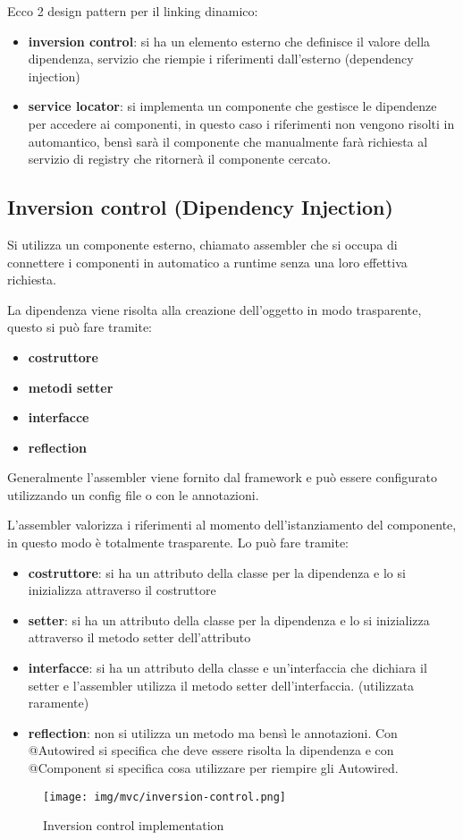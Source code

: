 Ecco 2 design pattern per il linking dinamico:
\begin{itemize}
    \item \textbf{inversion control}: si ha un elemento esterno che definisce il valore 
    della dipendenza, servizio che riempie i riferimenti dall'esterno (dependency injection)
    \item \textbf{service locator}: si implementa un componente che gestisce le dipendenze
    per accedere ai componenti, in questo caso i riferimenti non vengono risolti in
    automantico, bensì sarà il componente che manualmente farà richiesta al servizio
    di registry che ritornerà il componente cercato.
\end{itemize}
\subsection{Inversion control (Dipendency Injection)}
Si utilizza un componente esterno, chiamato assembler che si occupa di connettere
i componenti in automatico a runtime senza una loro effettiva richiesta.

La dipendenza viene risolta alla creazione dell'oggetto in modo trasparente, 
questo si può fare tramite:
\begin{itemize}
      \item \textbf{costruttore}
      \item \textbf{metodi setter}
      \item \textbf{interfacce}
      \item \textbf{reflection}
\end{itemize}
Generalmente l'assembler viene fornito dal framework e può essere configurato utilizzando
un config file o con le annotazioni. 

L'assembler valorizza i riferimenti al momento dell'istanziamento del componente, 
in questo modo è totalmente trasparente. Lo può fare tramite:
\begin{itemize}
    \item \textbf{costruttore}: si ha un attributo della classe per la dipendenza
    e lo si inizializza attraverso il costruttore 
    \item \textbf{setter}: si ha un attributo della classe per la dipendenza
    e lo si inizializza attraverso il metodo setter dell'attributo
    \item \textbf{interfacce}: si ha un attributo della classe e un'interfaccia
    che dichiara il setter e l'assembler utilizza il metodo setter dell'interfaccia. 
    (utilizzata raramente)
    \item \textbf{reflection}: non si utilizza un metodo ma bensì le annotazioni.
    Con @Autowired si specifica che deve essere risolta la dipendenza e con @Component
    si specifica cosa utilizzare per riempire gli Autowired.
\end{itemize}
\begin{figure}[!ht]
      \centering
      \texttt{[image: img/mvc/inversion-control.png]}
      \caption{Inversion control implementation}
\end{figure}

